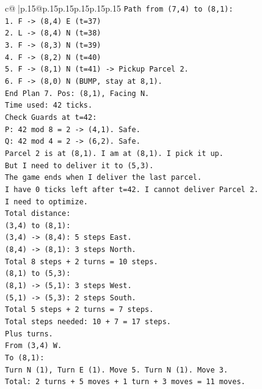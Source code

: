 \documentclass{article}
\begin{document}
{\begin{supertabular}{c@{$\;$}|p{.15\linewidth}@{}p{.15\linewidth}p{.15\linewidth}p{.15\linewidth}p{.15\linewidth}p{.15\linewidth}}
{{{\texttt{Path from (7,4) to (8,1):} \\
\texttt{1. F {-}> (8,4) E (t=37)} \\
\texttt{2. L {-}> (8,4) N (t=38)} \\
\texttt{3. F {-}> (8,3) N (t=39)} \\
\texttt{4. F {-}> (8,2) N (t=40)} \\
\texttt{5. F {-}> (8,1) N (t=41) {-}> Pickup Parcel 2.} \\
\texttt{6. F {-}> (8,0) N (BUMP, stay at 8,1).} \\
\texttt{End Plan 7. Pos: (8,1), Facing N.} \\
\texttt{Time used: 42 ticks.} \\
\texttt{Check Guards at t=42:} \\
\texttt{P: 42 mod 8 = 2 {-}> (4,1). Safe.} \\
\texttt{Q: 42 mod 4 = 2 {-}> (6,2). Safe.} \\
\texttt{Parcel 2 is at (8,1). I am at (8,1). I pick it up.} \\
\texttt{But I need to deliver it to (5,3).} \\
\texttt{The game ends when I deliver the last parcel.} \\
\texttt{I have 0 ticks left after t=42. I cannot deliver Parcel 2.} \\
\texttt{I need to optimize.} \\
\texttt{Total distance:} \\
\texttt{(3,4) to (8,1):} \\
\texttt{(3,4) {-}> (8,4): 5 steps East.} \\
\texttt{(8,4) {-}> (8,1): 3 steps North.} \\
\texttt{Total 8 steps + 2 turns = 10 steps.} \\
\texttt{(8,1) to (5,3):} \\
\texttt{(8,1) {-}> (5,1): 3 steps West.} \\
\texttt{(5,1) {-}> (5,3): 2 steps South.} \\
\texttt{Total 5 steps + 2 turns = 7 steps.} \\
\texttt{Total steps needed: 10 + 7 = 17 steps.} \\
\texttt{Plus turns.} \\
\texttt{From (3,4) W.} \\
\texttt{To (8,1):} \\
\texttt{Turn N (1), Turn E (1). Move 5. Turn N (1). Move 3.} \\
\texttt{Total: 2 turns + 5 moves + 1 turn + 3 moves = 11 moves.} \\
}}}
\end{supertabular}}
\end{document}
